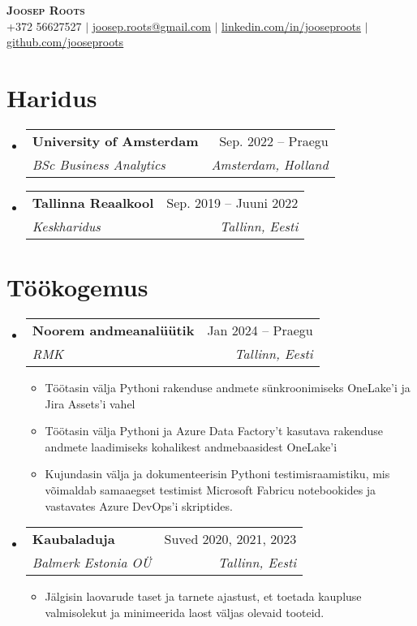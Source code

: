 \documentclass[letterpaper,11pt]{article}
\makeatletter
\newcommand{\resumeItem}[1]{
  \item\small{
    {#1 \vspace{-2pt}}
  }
}
\newcommand{\resumeSubheading}[4]{
  \vspace{-2pt}\item
    \begin{tabular*}{0.97\textwidth}[t]{l@{\extracolsep{\fill}}r}
      \textbf{#1} & #2 \\
      \textit{\small#3} & \textit{\small #4} \\
    \end{tabular*}\vspace{-7pt}
}
\newcommand{\resumeSubHeadingListStart}{\begin{itemize}[leftmargin=0.15in, label={}]}
\newcommand{\resumeSubHeadingListEnd}{\end{itemize}}
\newcommand{\resumeItemListStart}{\begin{itemize}}
\newcommand{\resumeItemListEnd}{\end{itemize}\vspace{-5pt}}
\makeatother
\begin{document}
\begin{center}
    \textbf{\Huge \scshape Joosep Roots} \\ \vspace{1pt}
    \small +372 56627527 $|$ \href{mailto:joosep.roots@gmail.com}{\underline{joosep.roots@gmail.com}} $|$ 
    \href{https://www.linkedin.com/in/jooseproots}{\underline{linkedin.com/in/jooseproots}} $|$
    \href{https://github.com/jooseproots}{\underline{github.com/jooseproots}}
\end{center}


\section{Haridus}
  \resumeSubHeadingListStart
    \resumeSubheading
      {University of Amsterdam}{Sep. 2022 -- Praegu}
      {BSc Business Analytics}{Amsterdam, Holland}
    \resumeSubheading
      {Tallinna Reaalkool}{Sep. 2019 -- Juuni 2022}
      {Keskharidus}{Tallinn, Eesti}
  \resumeSubHeadingListEnd


\section{Töökogemus}
  \resumeSubHeadingListStart

    \resumeSubheading
      {Noorem andmeanalüütik}{Jan 2024 -- Praegu}
      {RMK}{Tallinn, Eesti}
      \resumeItemListStart
        \resumeItem{Töötasin välja Pythoni rakenduse andmete sünkroonimiseks OneLake'i ja Jira Assets'i vahel}
        \resumeItem{Töötasin välja Pythoni ja Azure Data Factory't kasutava rakenduse andmete laadimiseks kohalikest andmebaasidest OneLake'i}
        \resumeItem{Kujundasin välja ja dokumenteerisin Pythoni testimisraamistiku, mis võimaldab samaaegset testimist Microsoft Fabricu notebookides ja vastavates Azure DevOps'i skriptides.}
      \resumeItemListEnd

    \resumeSubheading
      {Kaubaladuja}{Suved 2020, 2021, 2023}
      {Balmerk Estonia OÜ}{Tallinn, Eesti}
      \resumeItemListStart
        \resumeItem{Jälgisin laovarude taset ja tarnete ajastust, et toetada kaupluse valmisolekut ja minimeerida laost väljas olevaid tooteid.}
    \resumeItemListEnd

  \resumeSubHeadingListEnd


\end{document}
